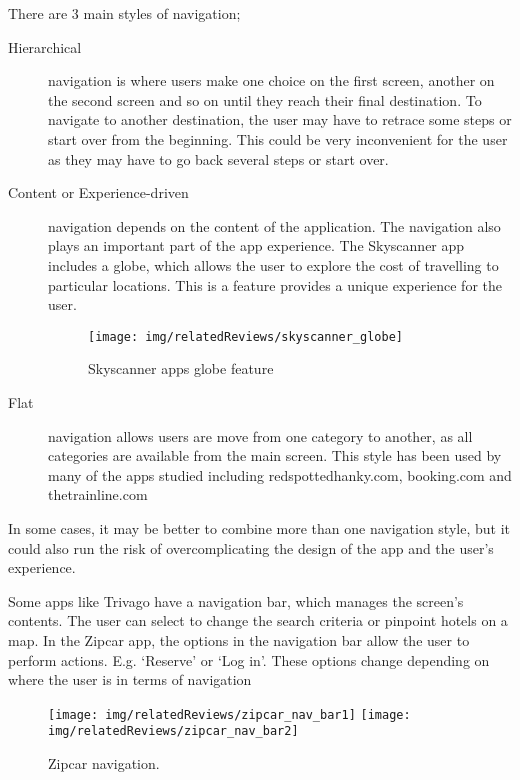 There are 3 main styles of navigation;
\begin{description}
	\item[Hierarchical] navigation is where users make one choice on the first
		screen, another on the second screen and so on until they reach their
		final destination. To navigate to another destination, the user may
		have to retrace some steps or start over from the beginning. This could
		be very inconvenient for the user as they may have to go back several
		steps or start over.
	\item[Content or Experience-driven] navigation depends on the content of
		the application. The navigation also plays an important part of the app
		experience. The Skyscanner app includes a globe, which allows the user
		to explore the cost of travelling to particular locations. This is a
		feature provides a unique experience for the user.
		\begin{figure}[ht]
			\begin{center}
				\texttt{[image: img/relatedReviews/skyscanner\_globe]}
			\end{center}
			\caption{Skyscanner apps globe feature}\label{fig:skyscanner_globe}
		\end{figure}

	\item[Flat] navigation allows users are move from one category to another,
		as all categories are available from the main screen. This style has
		been used by many of the apps studied including redspottedhanky.com,
		booking.com and thetrainline.com
\end{description}

In some cases, it may be better to combine more than one navigation style, but
it could also run the risk of overcomplicating the design of the app and the
user's experience.

Some apps like Trivago have a navigation bar, which manages the screen's
contents. The user can select to change the search criteria or pinpoint hotels
on a map. In the Zipcar app, the options in the navigation bar allow the user
to perform actions. E.g. `Reserve' or `Log in'. These options change depending
on where the user is in terms of navigation
\begin{figure}[ht]
	\begin{center}
		\texttt{[image: img/relatedReviews/zipcar\_nav\_bar1]}
		\quad
		\texttt{[image: img/relatedReviews/zipcar\_nav\_bar2]}
	\end{center}
	\caption{Zipcar navigation\cite{ZipCarIOS}.}\label{fig:zipcar_nav_bar}
\end{figure}


